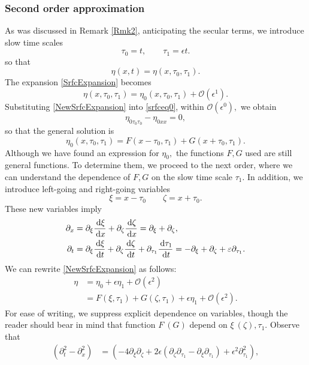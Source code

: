 \subsubsection*{Second order approximation}
As was discussed in Remark \eqref{Rmk2}, anticipating the secular terms, we introduce slow time scales
\[ \tau_0 = t, \qquad \tau_1 = \epsilon t. \]
so that 
\[ \eta(x, t) = \eta(x, \tau_0, \tau_1). \]
The expansion \eqref{SrfcExpansion} becomes
\begin{equation}\label{NewSrfcExpansion}
\eta(x, \tau_0, \tau_1) = \eta_0(x, \tau_0, \tau_1) + \mathcal{O}(\epsilon^1).
\end{equation}
Substituting \eqref{NewSrfcExpansion} into \eqref{srfceq0}, within $\mathcal{O}(\epsilon^0),$ we obtain
\begin{equation}\label{1stOrderApprox}
\eta_{0\tau_0 \tau_0} - \eta_{0xx} = 0,
\end{equation}
so that the general solution is 
\[ \eta_0(x, \tau_0, \tau_1) = F(x-\tau_0, \tau_1) + G(x+\tau_0, \tau_1). \]
Although we have found an expression for $\eta_0,$ the functions $F,G$ used are still general functions. To determine them, we proceed to the next order, where we can understand the dependence of $F,G$ on the slow time scale $\tau_1.$ In addition, we introduce left-going and right-going variables 
\[ 
\xi = x-\tau_0 \qquad \zeta = x+ \tau_0.
\]
These new variables imply
\begin{align*}
\partial_x &= \partial_\xi \frac{\,\mathrm{d} \xi}{\,\mathrm{d} x} + \partial_\zeta \frac{\,\mathrm{d} \zeta}{\,\mathrm{d} x} =\partial_\xi + \partial_\zeta, \\
\partial_t &= \partial_\xi \frac{\,\mathrm{d} \xi}{\,\mathrm{d} t} + \partial_\zeta \frac{\,\mathrm{d} \zeta}{\,\mathrm{d} t} + \partial_{\tau_1}\frac{\,\mathrm{d} \tau_1}{\,\mathrm{d} t} = - \partial_\xi + \partial_\zeta + \varepsilon \partial_{\tau_1}.
\end{align*}
We can rewrite \eqref{NewSrfcExpansion} as follows:
\begin{align*}
\eta &= \eta_0 + \epsilon \eta_1 + \mathcal{O}(\epsilon^2)  \\
&= F(\xi, \tau_1) + G(\zeta, \tau_1) + \epsilon \eta_1 + \mathcal{O}(\epsilon^2).
\end{align*}
For ease of writing, we suppress explicit dependence on variables, though the reader should bear in mind that function $F ~ (G)$ depend on $\xi ~ (\zeta), \tau_1.$ Observe that
\begin{align*}
(\partial_t^2 - \partial_x^2) &=  \left( - 4\partial_\xi \partial_\zeta + 2\epsilon(\partial_\zeta \partial_{\tau_1} - \partial_\xi\partial_{\tau_1}) + \epsilon^2 \partial_{\tau_1}^2 \right),
\end{align*}
